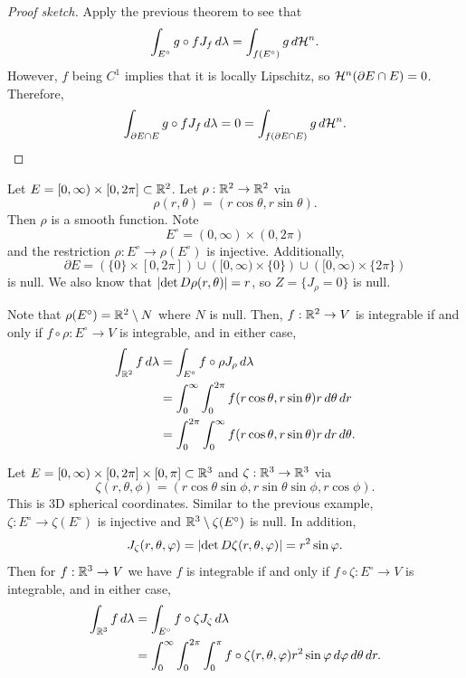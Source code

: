 \documentclass[a4paper]{article}
\begin{document}
\begin{proof}[Proof sketch]
  Apply the previous theorem to see that
  \[
    \int_{E^\circ} g \circ f J_f \, d \lambda
    = \int_{f(E^\circ)} g \, d \mathcal{H}^n.
  \]
  However, $f$ being $C^1$ implies that it is locally Lipschitz, so
  $\mathcal{H}^n (\partial E \cap E) = 0$. Therefore,
  \[
    \int_{\partial E \cap E} g \circ f J_f \, d \lambda
    = 0 = \int_{f(\partial E \cap E)} g \, d \mathcal{H}^n.
  \]
\end{proof}

\begin{eg}
  Let $E = [0, \infty) \times [0, 2 \pi] \subset \mathbb{R}^2$. Let $\rho: \mathbb{R}^2
    \to \mathbb{R}^2$ via
  \[
    \rho(r, \theta) = (r \cos \theta, r \sin \theta).
  \]
  Then $\rho$ is a smooth function. Note
  \[
    E^\circ = (0, \infty) \times (0, 2\pi)
  \]
  and the restriction $\rho : E^\circ \to \rho(E^\circ)$ is injective.
  Additionally,
  \[
    \partial E = \left( \{0\} \times [0, 2 \pi] \right) \cup
    \left( [0, \infty) \times \{0\} \right) \cup
    \left( [0, \infty) \times \{2 \pi\} \right)
  \]
  is null. We also know that $\left\lvert \det D\rho (r, \theta)\right\rvert = r$, so $Z =
  \{J_\rho = 0\}$ is null.

  Note that $\rho(E^\circ) = \mathbb{R}^2 \setminus N$ where $N$ is null. Then, $f
  : \mathbb{R}^2 \to V$ is integrable if and only if $f \circ \rho : E^\circ \to
  V$ is integrable, and in either case,
  \[
    \begin{aligned}
      \int_{\mathbb{R}^2} f \, d \lambda
       & = \int_{E^\circ} f \circ \rho J_{\rho}  \, d \lambda            \\
       & = \int_0^\infty \int_0^{2\pi} f(r \cos \theta, r \sin \theta)
      r \, d \theta \, d r                                                 \\
       & = \int_0^{2\pi} \int_0^\infty f(r \cos \theta, r \sin \theta)
      r \, d r \, d \theta.
    \end{aligned}
  \]
\end{eg}

\begin{eg}
  Let $E = [0, \infty) \times [0, 2 \pi] \times [0, \pi] \subset \mathbb{R}^3$ and
  $\zeta : \mathbb{R}^3 \to \mathbb{R}^3$ via
  \[
    \zeta(r, \theta, \phi) = (r \cos \theta \sin \phi,
    r \sin \theta \sin \phi, r \cos \phi).
  \]
  This is 3D spherical coordinates. Similar to the previous example,
  $\zeta: E^\circ \to \zeta(E^\circ)$ is injective and $\mathbb{R}^3 \setminus
  \zeta(E^\circ)$ is null. In addition,
  \[
    J_{\zeta}(r, \theta, \varphi) =
    \left\lvert \det D \zeta (r, \theta, \varphi)\right\rvert = r^2 \sin \varphi.
  \]
  Then for $f : \mathbb{R}^3 \to V$ we have $f$ is integrable if and only if $f
  \circ \zeta : E^\circ \to V$ is integrable, and in either case,
  \[
    \begin{aligned}
      \int_{\mathbb{R}^3} f \, d \lambda
       & = \int_{E^\circ} f \circ \zeta J_{\zeta} \, d \lambda \\
       & = \int_0^\infty \int_0^{2\pi} \int_0^\pi
      f \circ \zeta(r, \theta, \varphi) r^2 \sin \varphi \, d \varphi \, d \theta
      \, d r.
    \end{aligned}
  \]
\end{eg}
\end{document}
